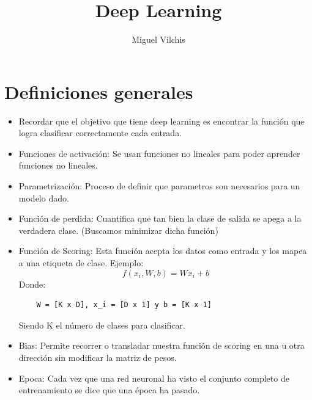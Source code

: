 \documentclass{article}
\begin{document}
\title{\vspace{-1cm}Deep Learning}
\author{Miguel Vilchis}
\date{}
\maketitle
\section{Definiciones generales}
  \begin{itemize}
    \item Recordar que el objetivo que tiene deep learning es encontrar 
    la función que logra clasificar correctamente cada entrada.
    \item Funciones de activación: Se usan funciones no lineales para
    poder aprender funciones no lineales.
    \item Parametrización: Proceso de definir que parametros son
    necesarios para un modelo dado.
    \item Función de perdida: Cuantifica que tan bien la clase de
    salida se apega a la verdadera clase. (Buscamos minimizar dicha
    función)
    \item Función de Scoring: Esta función acepta los datos como
    entrada y los mapea a una etiqueta de clase. Ejemplo: 
    \[ f(x_i, W, b) = Wx_i+b
    \] 
    Donde: 
    \begin{lstlisting}
    W = [K x D], x_i = [D x 1] y b = [K x 1]
    \end{lstlisting}
    Siendo K el número de clases para clasificar.
    \item Bias: Permite recorrer o transladar nuestra función de
    scoring en una u otra dirección sin modificar la matriz de pesos.
    \item Epoca: Cada vez que una red neuronal ha visto el conjunto completo 
    de entrenamiento se dice que una época ha pasado. 
  \end{itemize}
\end{document}

